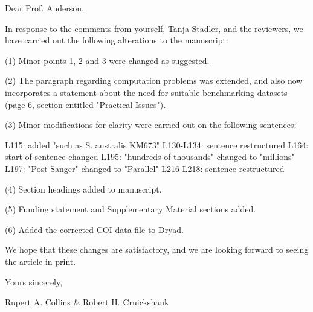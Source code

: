 %
%
%
%
%
%
%
%
%



Dear Prof. Anderson,

In response to the comments from yourself, Tanja Stadler, and the reviewers, we have carried out the following alterations to the manuscript: 

(1) Minor points 1, 2 and 3 were changed as suggested.

(2) The paragraph regarding computation problems was extended, and also now incorporates a statement about  the need for suitable benchmarking datasets (page 6, section entitled "Practical Issues").

(3) Minor modifications for clarity were carried out on the following sentences: 

	L115: added "such as S. australis KM673"
	L130-L134: sentence restructured
	L164: start of sentence changed
	L195: "hundreds of thousands" changed to "millions"
	L197: "Post-Sanger" changed to "Parallel"
	L216-L218:  sentence restructured

(4) Section headings added to manuscript.

(5) Funding statement and Supplementary Material sections added.

(6) Added the corrected COI data file to Dryad.


We hope that these changes are satisfactory, and we are looking forward to seeing the article in print.

Yours sincerely,

Rupert A. Collins & Robert H. Cruickshank